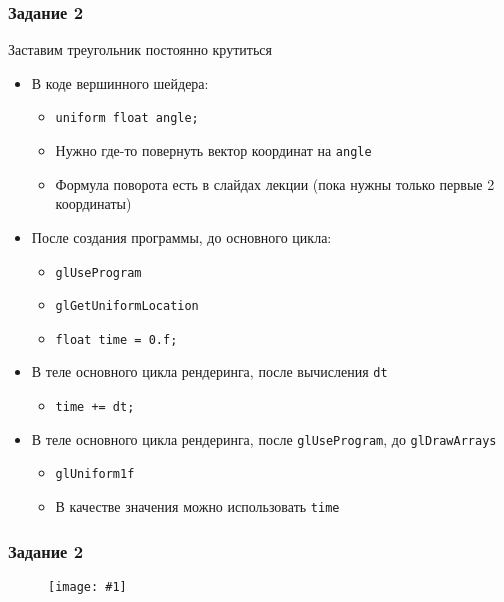 \documentclass{beamer}
\newcommand{\slideimage}[1]{
  \begin{figure}
    \begin{adjustbox}{width=\textwidth, totalheight=\textheight-2\baselineskip-2\baselineskip,keepaspectratio}
      \texttt{[image: \#1]}
    \end{adjustbox}
  \end{figure}
}
\begin{document}
\begin{frame}[fragile]
\frametitle{Задание 2}
Заставим треугольник постоянно крутиться
\begin{itemize}
\item В коде вершинного шейдера:
\begin{itemize}
\item \verb|uniform float angle;|
\item Нужно где-то повернуть вектор координат на \verb|angle|
\item Формула поворота есть в слайдах лекции (пока нужны только первые 2 координаты)
\end{itemize}
\item После создания программы, до основного цикла:
\begin{itemize}
\item \verb|glUseProgram|
\item \verb|glGetUniformLocation|
\item \verb|float time = 0.f;|
\end{itemize}
\item В теле основного цикла рендеринга, после вычисления \verb|dt|
\begin{itemize}
\item \verb|time += dt;|
\end{itemize}
\item В теле основного цикла рендеринга, после \verb|glUseProgram|, до \verb|glDrawArrays|
\begin{itemize}
\item \verb|glUniform1f|
\item В качестве значения можно использовать \verb|time|
\end{itemize}
\end{itemize}
\end{frame}

\begin{frame}
\frametitle{Задание 2}
\slideimage{2.png}
\end{frame}
\end{document}
